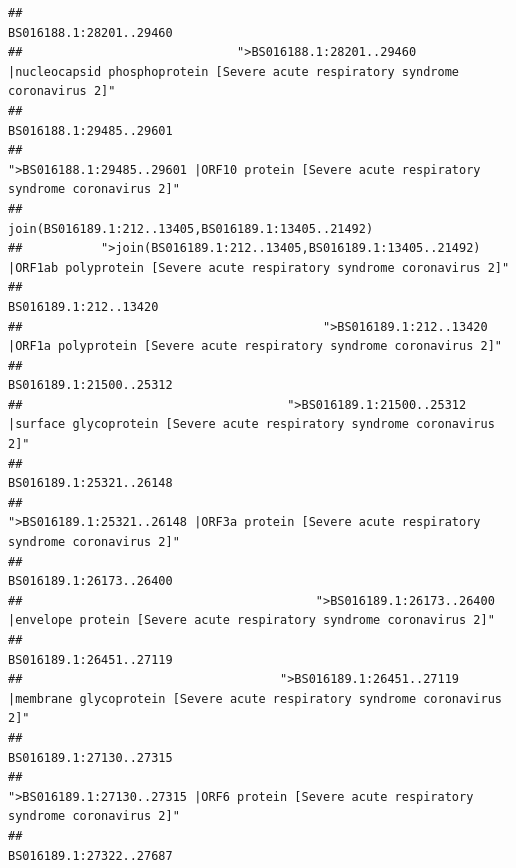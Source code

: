 \documentclass[
]{article}
\begin{document}
\begin{verbatim}
##                                                                                                                BS016188.1:28201..29460 
##                              ">BS016188.1:28201..29460 |nucleocapsid phosphoprotein [Severe acute respiratory syndrome coronavirus 2]" 
##                                                                                                                BS016188.1:29485..29601 
##                                            ">BS016188.1:29485..29601 |ORF10 protein [Severe acute respiratory syndrome coronavirus 2]" 
##                                                                                    join(BS016189.1:212..13405,BS016189.1:13405..21492) 
##           ">join(BS016189.1:212..13405,BS016189.1:13405..21492) |ORF1ab polyprotein [Severe acute respiratory syndrome coronavirus 2]" 
##                                                                                                                  BS016189.1:212..13420 
##                                          ">BS016189.1:212..13420 |ORF1a polyprotein [Severe acute respiratory syndrome coronavirus 2]" 
##                                                                                                                BS016189.1:21500..25312 
##                                     ">BS016189.1:21500..25312 |surface glycoprotein [Severe acute respiratory syndrome coronavirus 2]" 
##                                                                                                                BS016189.1:25321..26148 
##                                            ">BS016189.1:25321..26148 |ORF3a protein [Severe acute respiratory syndrome coronavirus 2]" 
##                                                                                                                BS016189.1:26173..26400 
##                                         ">BS016189.1:26173..26400 |envelope protein [Severe acute respiratory syndrome coronavirus 2]" 
##                                                                                                                BS016189.1:26451..27119 
##                                    ">BS016189.1:26451..27119 |membrane glycoprotein [Severe acute respiratory syndrome coronavirus 2]" 
##                                                                                                                BS016189.1:27130..27315 
##                                             ">BS016189.1:27130..27315 |ORF6 protein [Severe acute respiratory syndrome coronavirus 2]" 
##                                                                                                                BS016189.1:27322..27687 

\end{verbatim}
\end{document}
